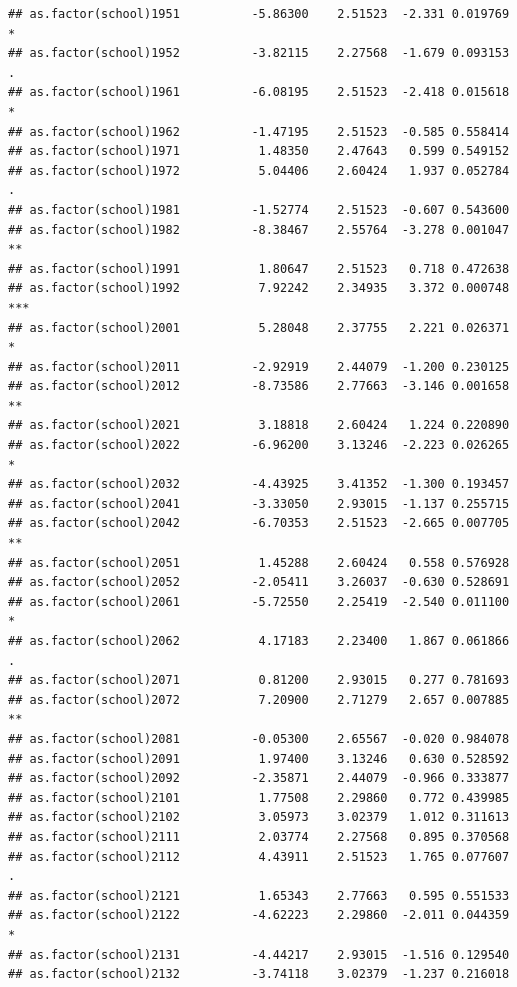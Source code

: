 \documentclass[ignorenonframetext,]{beamer}
\begin{document}
\begin{frame}[fragile]{}
\begin{verbatim}
## as.factor(school)1951          -5.86300    2.51523  -2.331 0.019769 *  
## as.factor(school)1952          -3.82115    2.27568  -1.679 0.093153 .  
## as.factor(school)1961          -6.08195    2.51523  -2.418 0.015618 *  
## as.factor(school)1962          -1.47195    2.51523  -0.585 0.558414    
## as.factor(school)1971           1.48350    2.47643   0.599 0.549152    
## as.factor(school)1972           5.04406    2.60424   1.937 0.052784 .  
## as.factor(school)1981          -1.52774    2.51523  -0.607 0.543600    
## as.factor(school)1982          -8.38467    2.55764  -3.278 0.001047 ** 
## as.factor(school)1991           1.80647    2.51523   0.718 0.472638    
## as.factor(school)1992           7.92242    2.34935   3.372 0.000748 ***
## as.factor(school)2001           5.28048    2.37755   2.221 0.026371 *  
## as.factor(school)2011          -2.92919    2.44079  -1.200 0.230125    
## as.factor(school)2012          -8.73586    2.77663  -3.146 0.001658 ** 
## as.factor(school)2021           3.18818    2.60424   1.224 0.220890    
## as.factor(school)2022          -6.96200    3.13246  -2.223 0.026265 *  
## as.factor(school)2032          -4.43925    3.41352  -1.300 0.193457    
## as.factor(school)2041          -3.33050    2.93015  -1.137 0.255715    
## as.factor(school)2042          -6.70353    2.51523  -2.665 0.007705 ** 
## as.factor(school)2051           1.45288    2.60424   0.558 0.576928    
## as.factor(school)2052          -2.05411    3.26037  -0.630 0.528691    
## as.factor(school)2061          -5.72550    2.25419  -2.540 0.011100 *  
## as.factor(school)2062           4.17183    2.23400   1.867 0.061866 .  
## as.factor(school)2071           0.81200    2.93015   0.277 0.781693    
## as.factor(school)2072           7.20900    2.71279   2.657 0.007885 ** 
## as.factor(school)2081          -0.05300    2.65567  -0.020 0.984078    
## as.factor(school)2091           1.97400    3.13246   0.630 0.528592    
## as.factor(school)2092          -2.35871    2.44079  -0.966 0.333877    
## as.factor(school)2101           1.77508    2.29860   0.772 0.439985    
## as.factor(school)2102           3.05973    3.02379   1.012 0.311613    
## as.factor(school)2111           2.03774    2.27568   0.895 0.370568    
## as.factor(school)2112           4.43911    2.51523   1.765 0.077607 .  
## as.factor(school)2121           1.65343    2.77663   0.595 0.551533    
## as.factor(school)2122          -4.62223    2.29860  -2.011 0.044359 *  
## as.factor(school)2131          -4.44217    2.93015  -1.516 0.129540    
## as.factor(school)2132          -3.74118    3.02379  -1.237 0.216018    

\end{verbatim}
\end{frame}
\end{document}
